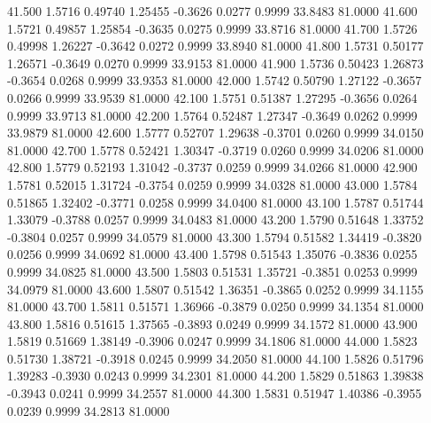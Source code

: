   41.500   1.5716   0.49740   1.25455  -0.3626   0.0277   0.9999  33.8483  81.0000
  41.600   1.5721   0.49857   1.25854  -0.3635   0.0275   0.9999  33.8716  81.0000
  41.700   1.5726   0.49998   1.26227  -0.3642   0.0272   0.9999  33.8940  81.0000
  41.800   1.5731   0.50177   1.26571  -0.3649   0.0270   0.9999  33.9153  81.0000
  41.900   1.5736   0.50423   1.26873  -0.3654   0.0268   0.9999  33.9353  81.0000
  42.000   1.5742   0.50790   1.27122  -0.3657   0.0266   0.9999  33.9539  81.0000
  42.100   1.5751   0.51387   1.27295  -0.3656   0.0264   0.9999  33.9713  81.0000
  42.200   1.5764   0.52487   1.27347  -0.3649   0.0262   0.9999  33.9879  81.0000
  42.600   1.5777   0.52707   1.29638  -0.3701   0.0260   0.9999  34.0150  81.0000
  42.700   1.5778   0.52421   1.30347  -0.3719   0.0260   0.9999  34.0206  81.0000
  42.800   1.5779   0.52193   1.31042  -0.3737   0.0259   0.9999  34.0266  81.0000
  42.900   1.5781   0.52015   1.31724  -0.3754   0.0259   0.9999  34.0328  81.0000
  43.000   1.5784   0.51865   1.32402  -0.3771   0.0258   0.9999  34.0400  81.0000
  43.100   1.5787   0.51744   1.33079  -0.3788   0.0257   0.9999  34.0483  81.0000
  43.200   1.5790   0.51648   1.33752  -0.3804   0.0257   0.9999  34.0579  81.0000
  43.300   1.5794   0.51582   1.34419  -0.3820   0.0256   0.9999  34.0692  81.0000
  43.400   1.5798   0.51543   1.35076  -0.3836   0.0255   0.9999  34.0825  81.0000
  43.500   1.5803   0.51531   1.35721  -0.3851   0.0253   0.9999  34.0979  81.0000
  43.600   1.5807   0.51542   1.36351  -0.3865   0.0252   0.9999  34.1155  81.0000
  43.700   1.5811   0.51571   1.36966  -0.3879   0.0250   0.9999  34.1354  81.0000
  43.800   1.5816   0.51615   1.37565  -0.3893   0.0249   0.9999  34.1572  81.0000
  43.900   1.5819   0.51669   1.38149  -0.3906   0.0247   0.9999  34.1806  81.0000
  44.000   1.5823   0.51730   1.38721  -0.3918   0.0245   0.9999  34.2050  81.0000
  44.100   1.5826   0.51796   1.39283  -0.3930   0.0243   0.9999  34.2301  81.0000
  44.200   1.5829   0.51863   1.39838  -0.3943   0.0241   0.9999  34.2557  81.0000
  44.300   1.5831   0.51947   1.40386  -0.3955   0.0239   0.9999  34.2813  81.0000
